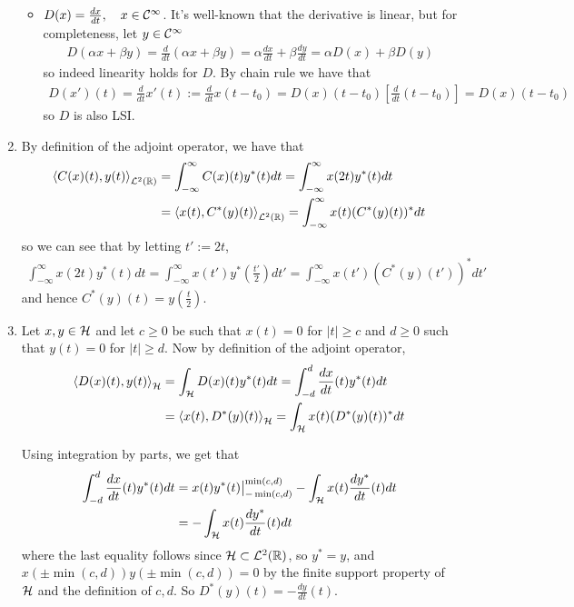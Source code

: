 \documentclass{article}
\makeatletter
\newcommand{\skipitems}[1]{%
  \addtocounter{\@enumctr}{#1}%
}
\makeatother
\begin{document}
\begin{enumerate}[label=(\roman*)]
\begin{itemize}
            \item $D(x)=\frac{dx}{dt},\quad x\in \mathcal{C}^\infty$. It's well-known that the derivative is linear, but for completeness, let $y\in \mathcal{C}^\infty$
            \begin{align}
                D(\alpha x + \beta y) = \frac{d}{dt}(\alpha x + \beta y) = \alpha \frac{dx}{dt} + \beta \frac{dy}{dt} = \alpha D(x) + \beta D(y)
            \end{align}
            so indeed linearity holds for $D$. By chain rule we have that
            \begin{align}
                D(x')(t)=\frac{d}{dt}x'(t) := \frac{d}{dt}x(t-t_0) =  D(x)(t-t_0) \left[\frac{d}{dt}(t-t_0)\right] =  D(x)(t-t_0)
            \end{align}
            so $D$ is also LSI.
        \end{itemize}
        
        \skipitems{1}
        \item By definition of the adjoint operator, we have that
        \begin{align}
            \left\langle C(x)(t),y(t) \right\rangle_{\mathcal{L}^2(\mathbb{R})} &= \int_{-\infty}^{\infty} C(x)(t)y^*(t) dt = \int_{-\infty}^{\infty} x(2t) y^*(t) dt \\
            &= \left\langle x(t),C^*(y)(t) \right\rangle_{\mathcal{L}^2(\mathbb{R})} = \int_{-\infty}^{\infty} x(t) (C^*(y)(t))^* dt
        \end{align}
        so we can see that by letting $t':=2t$,
        \begin{align}
            \int_{-\infty}^{\infty} x(2t) y^*(t) dt = \int_{-\infty}^{\infty} x(t') y^*\left(\frac{t'}{2}\right) dt'= \int_{-\infty}^{\infty} x(t') (C^*(y)(t'))^* dt'
        \end{align}
        and hence $C^*(y)(t)=y\left(\frac{t}{2}\right)$.
        \item Let $x,y\in \mathcal{H}$ and let $c\geq 0$ be such that $x(t)=0$ for $|t|\geq c$ and $d\geq 0$ such that $y(t)=0$ for $|t|\geq d$. Now by definition of the adjoint operator,
        \begin{align}
            \left\langle D(x)(t),y(t) \right\rangle_{\mathcal{H}} &= \int_{\mathcal{H}} D(x)(t)y^*(t) dt = \int_{-d }^{d} \frac{dx}{dt}(t) y^*(t) dt \\
            &= \left\langle x(t),D^*(y)(t) \right\rangle_{\mathcal{H}} = \int_{\mathcal{H}} x(t) (D^*(y)(t))^* dt
        \end{align}
        
        Using integration by parts, we get that
        \begin{align}
            \int_{-d }^{d} \frac{dx}{dt}(t) y^*(t) dt &=  x(t) y^*(t) \big\rvert_{-\min(c,d)}^{\min(c,d)} -  \int_{\mathcal{H}} x(t) \frac{dy^*}{dt}(t) dt \\
            &= -  \int_{\mathcal{H}} x(t) \frac{dy^*}{dt}(t) dt
        \end{align}
        where the last equality follows since $\mathcal{H}\subset \mathcal{L}^2(\mathbb{R})$, so $y^* = y$, and $x(\pm \min(c,d))y(\pm \min(c,d))=0$ by the finite support property of $\mathcal{H}$ and the definition of $c,d$. So $D^*(y)(t)=-\frac{dy}{dt}(t)$.
        
    \end{enumerate}
    
\end{document}
